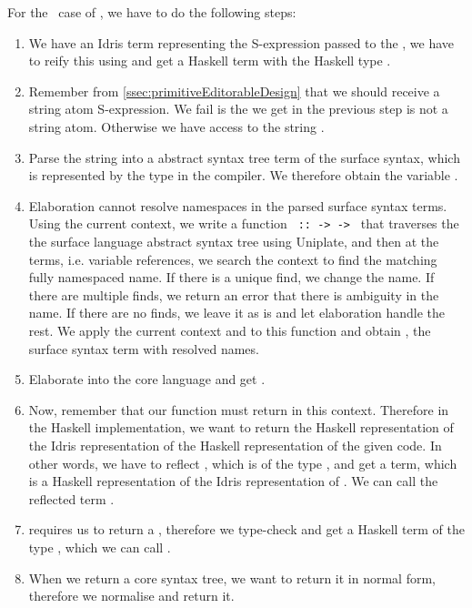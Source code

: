 For the \TT\ case of , we have to do the following steps:
\begin{enumerate}
  \item We have an Idris term  representing the S-expression passed to
    the , we have to reify this using  and
    get a Haskell term with the Haskell type .
  \item Remember from \autoref{ssec:primitiveEditorableDesign} that we should
    receive a string atom S-expression. We fail is the  we get in the
    previous step is not a string atom. Otherwise we have access to the string
    .
  \item Parse the string  into a abstract syntax tree term  of
    the surface syntax, which is represented by the type  in the
    compiler. We therefore obtain the variable .
  \item Elaboration cannot resolve namespaces in the parsed surface syntax
    terms.  Using the current context, we write a function
    \texttt{ ::  ->  ->   }
    that traverses the the surface language abstract syntax tree using
    Uniplate\cite{uniplate}, and then at the  terms, i.e. variable
    references, we search the context to find the matching fully namespaced
    name. If there is a unique find, we change the name. If there are multiple
    finds, we return an error that there is ambiguity in the name. If there are
    no finds, we leave it as is and let elaboration handle the rest.
    We apply the current context and  to this function and obtain
    , the surface syntax term with resolved names.
  \item Elaborate  into the core language and get .
  \item Now, remember that our function  must return
     in this context. Therefore in the Haskell implementation, we
    want to return the Haskell representation of the Idris representation of
    the Haskell representation of the given code. In other words, we have to
    reflect , which is of the type , and get a \Raw term, which
    is a Haskell representation of the Idris representation of .
    We can call the reflected term .
  \item {} requires us to return a , therefore we
    type-check  and get a Haskell term of the type ,
    which we can call .
  \item When we return a core syntax tree, we want to return it in normal form,
    therefore we normalise  and return it.
\end{enumerate}

